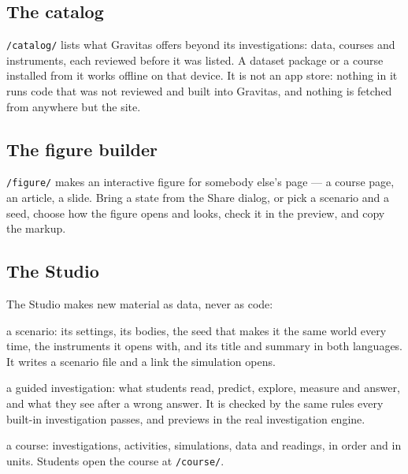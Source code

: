\documentclass[11pt,a4paper]{article}
\newcommand{\ui}[1]{\textsf{#1}}
\begin{document}
\subsection{The catalog}

\texttt{/catalog/} lists what Gravitas offers beyond its investigations: data,
courses and instruments, each reviewed before it was listed. A dataset package or a
course installed from it works offline on that device. It is not an app store:
nothing in it runs code that was not reviewed and built into Gravitas, and
nothing is fetched from anywhere but the site.

\subsection{The figure builder}

\texttt{/figure/} makes an interactive figure for somebody else's page --- a
course page, an article, a slide. Bring a state from the \ui{Share} dialog, or
pick a scenario and a seed, choose how the figure opens and looks, check it in
the preview, and copy the markup.

\subsection{The Studio}

The Studio makes new material as data, never as code:
\begin{description}[style=nextline,leftmargin=1em]
  \item[\texttt{/studio/}, the Scenario Studio] a scenario: its settings, its
  bodies, the seed that makes it the same world every time, the instruments
  it opens with, and its title and summary in both languages. It writes a
  scenario file and a link the simulation opens.
  \item[\texttt{/studio/lesson/}, the Investigation Composer] a guided
  investigation: what students read, predict, explore, measure and answer,
  and what they see after a wrong answer. It is checked by the same rules
  every built-in investigation passes, and previews in the real investigation engine.
  \item[\texttt{/studio/course/}, the course-package builder] a course: investigations,
  activities, simulations, data and readings, in order and in units. Students
  open the course at \texttt{/course/}.
\end{description}

\end{document}

